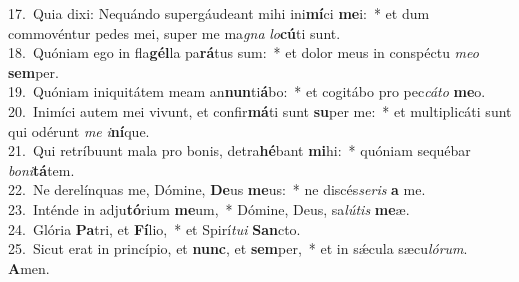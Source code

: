{17.~}Quia dixi: Nequándo supergáudeant mihi ini\textbf{mí}ci \textbf{me}i:~* et dum commovéntur pedes mei, super me ma\textit{gna} \textit{lo}\textbf{cú}ti sunt.\\
{18.~}Quóniam ego in fla\textbf{gél}la pa\textbf{rá}tus sum:~* et dolor meus in conspéctu \textit{me}\textit{o} \textbf{sem}per.\\
{19.~}Quóniam iniquitátem meam an\textbf{nun}ti\textbf{á}bo:~* et cogitábo pro pec\textit{cá}\textit{to} \textbf{me}o.\\
{20.~}Inimíci autem mei vivunt, et confir\textbf{má}ti sunt \textbf{su}per me:~* et multiplicáti sunt qui odérunt \textit{me} \textit{i}\textbf{ní}que.\\
{21.~}Qui retríbuunt mala pro bonis, detra\textbf{hé}bant \textbf{mi}hi:~* quóniam sequébar \textit{bo}\textit{ni}\textbf{tá}tem.\\
{22.~}Ne derelínquas me, Dómine, \textbf{De}us \textbf{me}us:~* ne discés\textit{se}\textit{ris} \textbf{a} me.\\
{23.~}Inténde in adju\textbf{tó}rium \textbf{me}um,~* Dómine, Deus, sa\textit{lú}\textit{tis} \textbf{me}æ.\\
{24.~}Glória \textbf{Pa}tri, et \textbf{Fí}lio,~* et Spirí\textit{tu}\textit{i} \textbf{San}cto.\\
{25.~}Sicut erat in princípio, et \textbf{nunc}, et \textbf{sem}per,~* et in sǽcula sæcu\textit{ló}\textit{rum}. \textbf{A}men.\\
